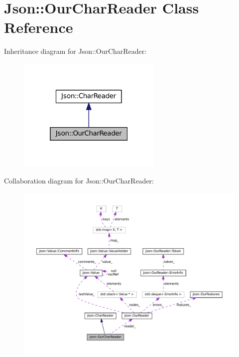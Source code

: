\hypertarget{classJson_1_1OurCharReader}{}\section{Json\+:\+:Our\+Char\+Reader Class Reference}
\label{classJson_1_1OurCharReader}


Inheritance diagram for Json\+:\+:Our\+Char\+Reader\+:
\nopagebreak
\begin{figure}[H]
\begin{center}
\leavevmode
\includegraphics[width=196pt]{classJson_1_1OurCharReader__inherit__graph}
\end{center}
\end{figure}


Collaboration diagram for Json\+:\+:Our\+Char\+Reader\+:
\nopagebreak
\begin{figure}[H]
\begin{center}
\leavevmode
\includegraphics[width=350pt]{classJson_1_1OurCharReader__coll__graph}
\end{center}
\end{figure}
